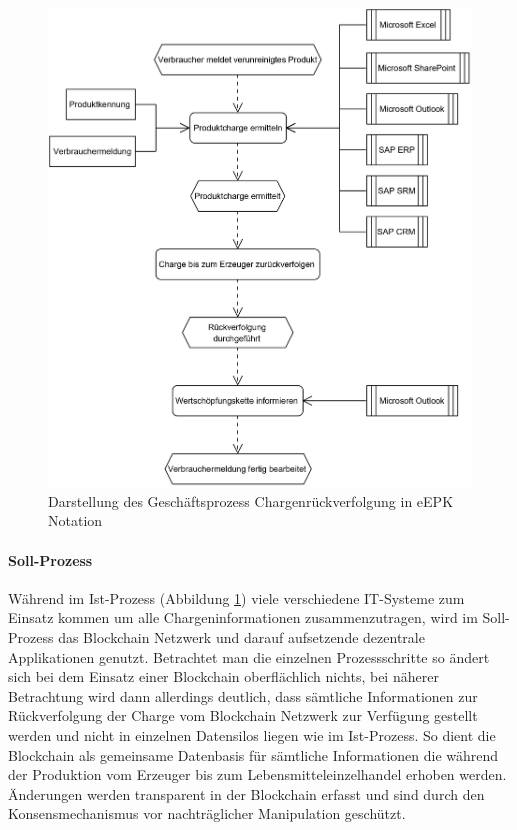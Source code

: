 \begin{figure}[H]
	\centering
	\includegraphics[width=1\linewidth]{pictures/business-process-source-epc-diagram-bw}
	\caption[Darstellung des Geschäftsprozess Chargenrückverfolgung in eEPK Notation]{Darstellung des Geschäftsprozess Chargenrückverfolgung in eEPK Notation}
	\label{fig:business-process-epc-diagramm}
\end{figure}

\paragraph{Soll-Prozess}
Während im Ist-Prozess (Abbildung \ref{fig:business-process-epc-diagramm}) viele verschiedene IT-Systeme zum Einsatz kommen um alle Chargeninformationen zusammenzutragen, wird im Soll-Prozess das Blockchain Netzwerk und darauf aufsetzende dezentrale Applikationen genutzt. Betrachtet man die einzelnen Prozessschritte so ändert sich bei dem Einsatz einer Blockchain oberflächlich nichts, bei näherer Betrachtung wird dann allerdings deutlich, dass sämtliche Informationen zur Rückverfolgung der Charge vom Blockchain Netzwerk zur Verfügung gestellt werden und nicht in einzelnen Datensilos liegen wie im Ist-Prozess. So dient die Blockchain als gemeinsame Datenbasis für sämtliche Informationen die während der Produktion vom Erzeuger bis zum Lebensmitteleinzelhandel erhoben werden. Änderungen werden transparent in der Blockchain erfasst und sind durch den Konsensmechanismus vor nachträglicher Manipulation geschützt. 

